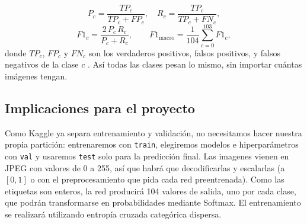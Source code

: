 \begin{equation}
P_c=\frac{TP_c}{TP_c+FP_c}, \quad R_c=\frac{TP_c}{TP_c+FN_c},
\end{equation}
\begin{equation}
F1_c=\frac{2\,P_c\,R_c}{P_c+R_c}, \qquad F1_{\text{macro}}=\frac{1}{104}\sum_{c=0}^{103}F1_c,
\end{equation}
donde $TP_c$, $FP_c$ y $FN_c$ son los verdaderos positivos, falsos positivos, y falsos negativos de la clase $c$ . Así todas las clases pesan lo mismo, sin importar cuántas imágenes tengan. 

\subsection{Implicaciones para el proyecto}
Como Kaggle ya separa entrenamiento y validación, no necesitamos hacer nuestra propia partición: entrenaremos con \texttt{train}, elegiremos modelos e hiperparámetros con \texttt{val} y usaremos \texttt{test} solo para la predicción final. Las imagenes vienen en JPEG con valores de 0 a 255, así que habrá que decodificarlas y escalarlas (a $[0,1]$ o con el preprocesamiento que pida cada red preentrenada). Como las etiquetas son enteros,  la red producirá 104 valores de salida, uno por cada clase, que podrán transformarse en probabilidades mediante Softmax. El entrenamiento se
realizará utilizando entropía cruzada categórica dispersa.
